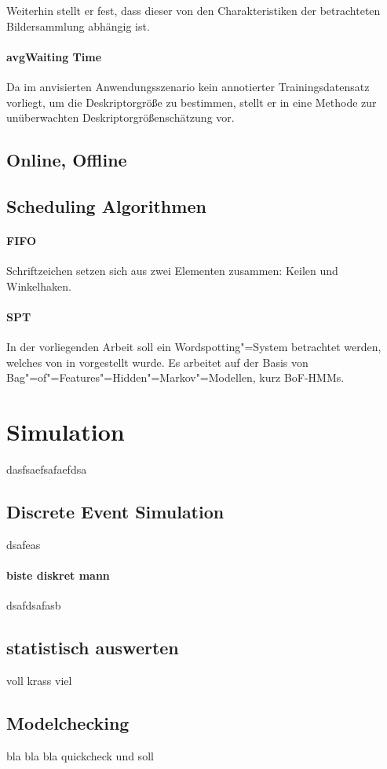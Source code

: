 Weiterhin stellt er fest, dass dieser von den Charakteristiken der betrachteten Bildersammlung abhängig ist. 
\paragraph{avgWaiting Time}
Da im anvisierten Anwendungsszenario kein annotierter Trainingsdatensatz vorliegt, um die Deskriptorgröße zu bestimmen, 
stellt er in \cite[Kap. 5.4.1]{LDiss} eine Methode zur unüberwachten Deskriptorgrößenschätzung vor.

\subsection{Online, Offline}

\subsection{Scheduling Algorithmen}

\paragraph{FIFO}
Schriftzeichen setzen sich aus zwei Elementen zusammen: Keilen und Winkelhaken. 

\paragraph{SPT}
In der vorliegenden Arbeit soll ein Wordspotting"=System betrachtet werden, welches von 
in \cite{LDiss} vorgestellt wurde. Es arbeitet auf der Basis von Bag"=of"=Features"=Hidden"=Markov"=Modellen, kurz
BoF-HMMs.



\section{Simulation}

dasfsaefsafaefdsa

\subsection{Discrete Event Simulation}

dsafeas

\paragraph{biste diskret mann}
dsafdsafasb

\subsection{statistisch auswerten}

voll krass viel

\subsection{Modelchecking}

bla bla bla quickcheck und soll


